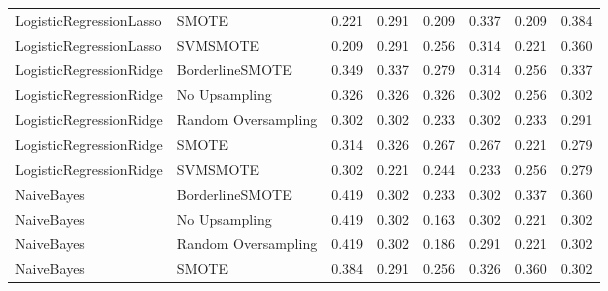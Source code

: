 \begin{tabular}{llllllll}
     LogisticRegressionLasso &               SMOTE &     0.221 &                     0.291 &                 0.209 &                  0.337 &                                   0.209 &     0.384 \\
     LogisticRegressionLasso &            SVMSMOTE &     0.209 &                     0.291 &                 0.256 &                  0.314 &                                   0.221 &     0.360 \\
     LogisticRegressionRidge &     BorderlineSMOTE &     0.349 &                     0.337 &                 0.279 &                  0.314 &                                   0.256 &     0.337 \\
     LogisticRegressionRidge &       No Upsampling &     0.326 &                     0.326 &                 0.326 &                  0.302 &                                   0.256 &     0.302 \\
     LogisticRegressionRidge & Random Oversampling &     0.302 &                     0.302 &                 0.233 &                  0.302 &                                   0.233 &     0.291 \\
     LogisticRegressionRidge &               SMOTE &     0.314 &                     0.326 &                 0.267 &                  0.267 &                                   0.221 &     0.279 \\
     LogisticRegressionRidge &            SVMSMOTE &     0.302 &                     0.221 &                 0.244 &                  0.233 &                                   0.256 &     0.279 \\
                  NaiveBayes &     BorderlineSMOTE &     0.419 &                     0.302 &                 0.233 &                  0.302 &                                   0.337 &     0.360 \\
                  NaiveBayes &       No Upsampling &     0.419 &                     0.302 &                 0.163 &                  0.302 &                                   0.221 &     0.302 \\
                  NaiveBayes & Random Oversampling &     0.419 &                     0.302 &                 0.186 &                  0.291 &                                   0.221 &     0.302 \\
                  NaiveBayes &               SMOTE &     0.384 &                     0.291 &                 0.256 &                  0.326 &                                   0.360 &     0.302 \\

\end{tabular}
